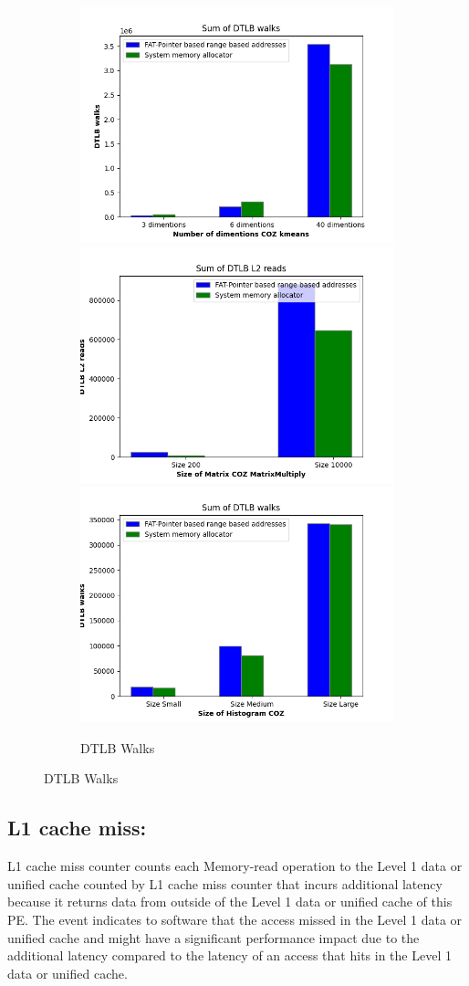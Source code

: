 \begin{figure}
  \begin{subfigure}{\linewidth}
    \includegraphics[width=.5\linewidth]{tlb-walk-kmeans.png}\hfill
    \includegraphics[width=.5\linewidth]{tlb-walk-matrixmultiply.png}\hfill
    \includegraphics[width=.5\linewidth]{tlb-walk-histogram.png}
  \caption{DTLB Walks}
\end{subfigure}
\end{figure}

\subsection{L1 cache miss:}
L1 cache miss counter counts each Memory-read operation to the Level 1 data or unified cache counted by L1 cache miss counter that incurs additional latency because it returns data from outside of the Level 1 data or unified cache of this PE.
The event indicates to software that the access missed in the Level 1 data or unified cache and might have a significant performance impact due to the additional latency compared to the latency of an access that hits in the Level 1 data or unified cache.

